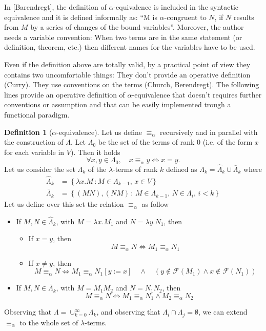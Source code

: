 \documentclass[a4paper,11pt]{article}
\theoremstyle{definition}
\newtheorem{defn}{Definition}
\newcommand{\FF}{\mathcal{F}}
\begin{document}
In [Barendregt], the definition of $\alpha$-equivalence is included in the
syntactic equivalence and it is defined informally as: ``M is
$\alpha$-congruent to $N$, if $N$ results from $M$ by a series of changes of
the bound variables''. Moreover, the author needs a variable convention: 
When two terms are in the same statement (or definition,
theorem, etc.) then different names for the variables have to be used.

Even if the definition above are totally valid, by a practical point of view
they contains two uncomfortable things: They don't provide an
operative definition (Curry). They use conventions on the terms (Church,
Berendregt). The following lines provide an operative definition of
$\alpha$-equivalence that doesn't requires further conventions or assumption
and that can be easily implemented trough a functional paradigm.

\begin{defn}[$\alpha$-equivalence]
  Let us define $\equiv_\alpha$ recursively and in parallel with the
  construction of $\Lambda$.
  Let $\Lambda_0$ be the set of the terms of rank $0$ (i.e, of the form $x$ for
  each variable in $V$). Then it holds
  \[
    \forall x,y \in \Lambda_0,\quad x\equiv_\alpha y\iff x=y.
  \]
  Let us consider the set $\Lambda_k$ of the $\lambda$-terms of rank $k$
  defined as $\Lambda_k = \hat\Lambda_k\cup \bar\Lambda_k$ where
  \[
    \begin{aligned}
      \hat \Lambda_k &=\left\{ \lambda
      x.M\,:M\in\Lambda_{k-1},\,x\in V\right\}\\
      \bar \Lambda_k&=\left\{ (MN), (NM)\,:\, M\in\Lambda_{k-1},\,N\in\Lambda_i,\,i<k \right\}
    \end{aligned}
  \]
  Let us define over this set the relation $\equiv_\alpha$ as follow
  \begin{itemize}
    \item If $M,N\in\hat\Lambda_{k}$, with $M=\lambda x.M_1$ and $N=\lambda
      y.N_1$, then
      \begin{itemize}
        \item If $x=y$, then
          \[
            M\equiv_\alpha N \iff M_1\equiv_\alpha N_1
          \]
        \item If $x\ne y$, then
          \[
            M\equiv_\alpha N \iff M_1\equiv_\alpha N_1[y:=x]\quad\wedge\quad
            (y\not\in\FF(M_1) \wedge x\not\in\FF(N_1))
          \]
      \end{itemize}
    \item If $M,N\in\bar\Lambda_k$, with $M=M_1M_2$ and $N=N_1N_2$, then
      \[
        M\equiv_\alpha N \iff M_1\equiv_\alpha N_1\wedge M_2\equiv_\alpha N_2
      \]
  \end{itemize}

  Observing that $\Lambda = \cup_{k=0}^\infty\Lambda_k$, and observing that
  $\Lambda_i\cap\Lambda_j=\emptyset$, we can extend $\equiv_\alpha$ to the
  whole set of $\lambda$-terms.
\end{defn}
\end{document}
